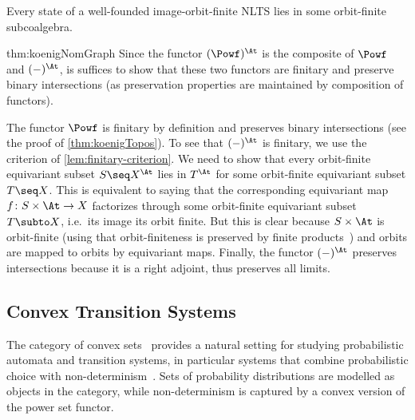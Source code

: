 \begin{theorem}\label{thm:koenigNomGraph}
  Every state of a well-founded image-orbit-finite NLTS lies in some orbit-finite subcoalgebra.
\end{theorem}
\begin{proofappendix}{thm:koenigNomGraph}
Since the functor $(\Powf)^\At$ is the composite of $\Powf$ and $(-)^\At$, is suffices to show that these two functors are finitary and preserve binary intersections (as preservation properties are maintained by composition of functors).

The functor $\Powf$ is finitary by definition and preserves binary intersections (see the proof of \autoref{thm:koenigTopos}). To see that $(-)^\At$ is finitary, we use the criterion of \autoref{lem:finitary-criterion}. We need to show that every orbit-finite equivariant subset $S\seq X^\At$ lies in $T^\At$ for some orbit-finite equivariant subset $T\seq X$. This is equivalent to saying that the corresponding equivariant map $f\colon S\times \At \to X$ factorizes through some orbit-finite equivariant subset $T\subto X$, i.e.\ its image its orbit finite. But this is clear because $S\times \At$ is orbit-finite (using that orbit-finiteness is preserved by finite products~\cite{pitts13}) and orbits are mapped to orbits by equivariant maps. Finally, the functor $(-)^\At$ preserves intersections because it is a right adjoint, thus preserves all limits.   
\end{proofappendix}

\subsection{Convex Transition Systems}
\label{sec:convex}
The category of {convex sets}~\cite{stone-49} provides a natural setting for studying probabilistic automata and transition systems, in particular systems that combine probabilistic choice with non-determinism~\cite{bss17,mv20,msv21,bsv22}. Sets of probability distributions are modelled as objects in the category, while non-determinism is captured by a convex version of the power set functor. 

